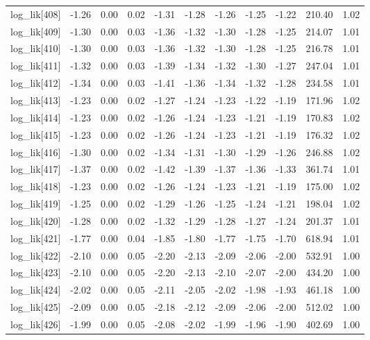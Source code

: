 \begin{table}[ht]
\begin{tabular}{rrrrrrrrrrr}
  log\_lik[408] & -1.26 & 0.00 & 0.02 & -1.31 & -1.28 & -1.26 & -1.25 & -1.22 & 210.40 & 1.02 \\ 
  log\_lik[409] & -1.30 & 0.00 & 0.03 & -1.36 & -1.32 & -1.30 & -1.28 & -1.25 & 214.07 & 1.01 \\ 
  log\_lik[410] & -1.30 & 0.00 & 0.03 & -1.36 & -1.32 & -1.30 & -1.28 & -1.25 & 216.78 & 1.01 \\ 
  log\_lik[411] & -1.32 & 0.00 & 0.03 & -1.39 & -1.34 & -1.32 & -1.30 & -1.27 & 247.04 & 1.01 \\ 
  log\_lik[412] & -1.34 & 0.00 & 0.03 & -1.41 & -1.36 & -1.34 & -1.32 & -1.28 & 234.58 & 1.01 \\ 
  log\_lik[413] & -1.23 & 0.00 & 0.02 & -1.27 & -1.24 & -1.23 & -1.22 & -1.19 & 171.96 & 1.02 \\ 
  log\_lik[414] & -1.23 & 0.00 & 0.02 & -1.26 & -1.24 & -1.23 & -1.21 & -1.19 & 170.83 & 1.02 \\ 
  log\_lik[415] & -1.23 & 0.00 & 0.02 & -1.26 & -1.24 & -1.23 & -1.21 & -1.19 & 176.32 & 1.02 \\ 
  log\_lik[416] & -1.30 & 0.00 & 0.02 & -1.34 & -1.31 & -1.30 & -1.29 & -1.26 & 246.88 & 1.02 \\ 
  log\_lik[417] & -1.37 & 0.00 & 0.02 & -1.42 & -1.39 & -1.37 & -1.36 & -1.33 & 361.74 & 1.01 \\ 
  log\_lik[418] & -1.23 & 0.00 & 0.02 & -1.26 & -1.24 & -1.23 & -1.21 & -1.19 & 175.00 & 1.02 \\ 
  log\_lik[419] & -1.25 & 0.00 & 0.02 & -1.29 & -1.26 & -1.25 & -1.24 & -1.21 & 198.04 & 1.02 \\ 
  log\_lik[420] & -1.28 & 0.00 & 0.02 & -1.32 & -1.29 & -1.28 & -1.27 & -1.24 & 201.37 & 1.01 \\ 
  log\_lik[421] & -1.77 & 0.00 & 0.04 & -1.85 & -1.80 & -1.77 & -1.75 & -1.70 & 618.94 & 1.01 \\ 
  log\_lik[422] & -2.10 & 0.00 & 0.05 & -2.20 & -2.13 & -2.09 & -2.06 & -2.00 & 532.91 & 1.00 \\ 
  log\_lik[423] & -2.10 & 0.00 & 0.05 & -2.20 & -2.13 & -2.10 & -2.07 & -2.00 & 434.20 & 1.00 \\ 
  log\_lik[424] & -2.02 & 0.00 & 0.05 & -2.11 & -2.05 & -2.02 & -1.98 & -1.93 & 461.18 & 1.00 \\ 
  log\_lik[425] & -2.09 & 0.00 & 0.05 & -2.18 & -2.12 & -2.09 & -2.06 & -2.00 & 512.02 & 1.00 \\ 
  log\_lik[426] & -1.99 & 0.00 & 0.05 & -2.08 & -2.02 & -1.99 & -1.96 & -1.90 & 402.69 & 1.00 \\ 

\end{tabular}
\end{table}
